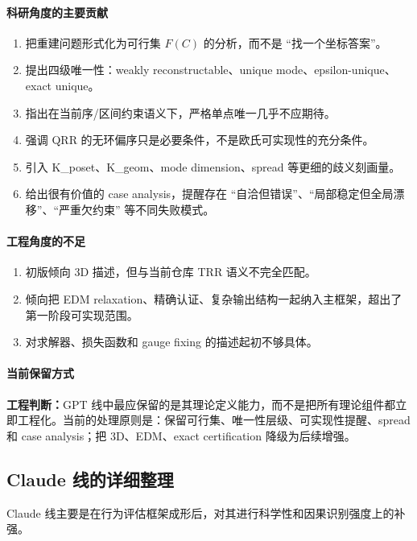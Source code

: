 \documentclass[11pt,a4paper]{ctexart}
\newcommand{\engineering}[1]{\textbf{工程判断：}#1}
\begin{document}
\paragraph{科研角度的主要贡献}
\begin{enumerate}[label=\arabic*.]
  \item 把重建问题形式化为可行集 $F(C)$ 的分析，而不是 ``找一个坐标答案''。
  \item 提出四级唯一性：weakly reconstructable、unique mode、epsilon-unique、exact unique。
  \item 指出在当前序/区间约束语义下，严格单点唯一几乎不应期待。
  \item 强调 QRR 的无环偏序只是必要条件，不是欧氏可实现性的充分条件。
  \item 引入 K\_poset、K\_geom、mode dimension、spread 等更细的歧义刻画量。
  \item 给出很有价值的 case analysis，提醒存在 ``自洽但错误''、``局部稳定但全局漂移''、``严重欠约束'' 等不同失败模式。
\end{enumerate}

\paragraph{工程角度的不足}
\begin{enumerate}[label=\arabic*.]
  \item 初版倾向 3D 描述，但与当前仓库 TRR 语义不完全匹配。
  \item 倾向把 EDM relaxation、精确认证、复杂输出结构一起纳入主框架，超出了第一阶段可实现范围。
  \item 对求解器、损失函数和 gauge fixing 的描述起初不够具体。
\end{enumerate}

\paragraph{当前保留方式}
\engineering{GPT 线中最应保留的是其理论定义能力，而不是把所有理论组件都立即工程化。当前的处理原则是：保留可行集、唯一性层级、可实现性提醒、spread 和 case analysis；把 3D、EDM、exact certification 降级为后续增强。}

\subsection{Claude 线的详细整理}

Claude 线主要是在行为评估框架成形后，对其进行科学性和因果识别强度上的补强。
\end{document}
